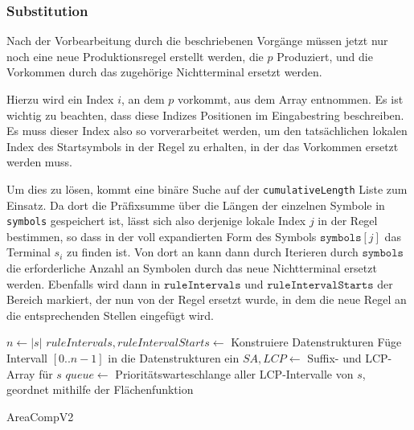 \subsubsection{Substitution}

Nach der Vorbearbeitung durch die beschriebenen Vorgänge müssen jetzt nur noch eine neue Produktionsregel erstellt werden, die $p$ Produziert, und die Vorkommen durch das zugehörige Nichtterminal ersetzt werden.

Hierzu wird ein Index $i$, an dem $p$ vorkommt, aus dem Array entnommen. Es ist wichtig zu beachten, dass diese Indizes Positionen im Eingabestring beschreiben. Es muss dieser Index also so vorverarbeitet werden, um den tatsächlichen lokalen Index des Startsymbols in der Regel zu erhalten, in der das Vorkommen ersetzt werden muss.

Um dies zu lösen, kommt eine binäre Suche auf der \texttt{cumulativeLength} Liste zum Einsatz. Da dort die Präfixsumme über die Längen der einzelnen Symbole in \texttt{symbols} gespeichert ist, 
lässt sich also derjenige lokale Index $j$ in der Regel bestimmen, so dass in der voll expandierten Form des Symbols $\texttt{symbols}[j]$ das Terminal $s_{i}$ zu finden ist.
Von dort an kann dann durch Iterieren durch $\texttt{symbols}$ die erforderliche Anzahl an Symbolen durch das neue Nichtterminal ersetzt werden.
Ebenfalls wird dann in $\texttt{ruleIntervals}$ und $\texttt{ruleIntervalStarts}$ der Bereich markiert, der nun von der Regel ersetzt wurde, in dem die neue Regel an die entsprechenden Stellen eingefügt wird.

\begin{algorithm}[t]
    $n \leftarrow |s|$\;
    $ruleIntervals, ruleIntervalStarts \leftarrow$ Konstruiere Datenstrukturen\;
    Füge Intervall $[0..n-1]$ in die Datenstrukturen ein\;
    $SA, LCP \leftarrow$ Suffix- und LCP-Array für $s$\;
    $queue \leftarrow$ Prioritätswarteschlange aller LCP-Intervalle von $s$, geordnet mithilfe der Flächenfunktion\;

    \caption{AreaCompV2}
    \label{v2algo}
\end{algorithm}



